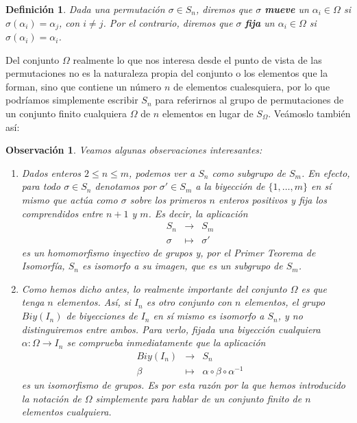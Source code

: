 \documentclass[12pt]{article}
\newtheorem{definition}[theorem]{Definición}
\newtheorem{observation}{Observación}[theorem]
\begin{document}
\begin{definition}Dada una permutación $\sigma \in S_n$, diremos que $\sigma$ \textbf{mueve} un $\alpha_i \in \Omega$ si $\sigma( \alpha_i) = \alpha_j$, con $i\neq j$. Por el contrario, diremos que $\sigma$ \textbf{fija} un $\alpha_i \in \Omega$ si $\sigma (\alpha_i ) = \alpha_i$.
\end{definition}

Del conjunto $\Omega$ realmente lo que nos interesa desde el punto de vista de las permutaciones no es la naturaleza propia del conjunto o los elementos que la forman, sino que contiene un número $n$ de elementos cualesquiera, por lo que podríamos simplemente escribir $S_n$ para referirnos al grupo de permutaciones de un conjunto finito cualquiera $\Omega$ de $n$ elementos en lugar de $S_\Omega$. Veámoslo también así:

\begin{observation}\label{eq:obsabel} Veamos algunas observaciones interesantes:
\begin{enumerate}
\item Dados enteros $2 \leq n \leq m$, podemos ver a $S_{n}$ como subgrupo de $S_{m}$. En efecto, para todo $\sigma \in S_{n}$ denotamos por $\sigma' \in S_{m}$ a la biyección de $\lbrace 1, \ldots, m \rbrace$ en sí mismo que actúa como $\sigma$ sobre los primeros $n$ enteros positivos y fija los comprendidos entre $n+1$ y $m$. Es decir, la aplicación $$\begin{array}{rccl}
&S_{n}& \longrightarrow &S_{m}\\
&\sigma& \longmapsto &\sigma'
\end{array}
$$ es un homomorfismo inyectivo de grupos y, por el \textit{Primer Teorema de Isomorfía}, $S_{n}$ es isomorfo a su imagen, que es un subgrupo de $S_{m}$.
\item Como hemos dicho antes, lo realmente importante del conjunto $\Omega$ es que tenga $n$ elementos. Así, si $I_{n}$ es otro conjunto con $n$ elementos, el grupo $Biy(I_{n})$ de biyecciones de $I_{n}$ en sí mismo es isomorfo a $S_{n}$, y no distinguiremos entre ambos. Para verlo, fijada una biyección cualquiera $\alpha \colon \Omega \longrightarrow I_{n}$ se comprueba inmediatamente que la aplicación  $$\begin{array}{rccl}
&Biy(I_{n})& \longrightarrow &S_{n}\\
&\beta& \longmapsto &\alpha\circ \beta \circ \alpha^{-1}
\end{array}
$$ es un isomorfismo de grupos. Es por esta razón por la que hemos introducido la notación de $\Omega$ simplemente para hablar de un conjunto finito de $n$ elementos cualquiera.
\end{enumerate}
\end{observation}
\end{document}
